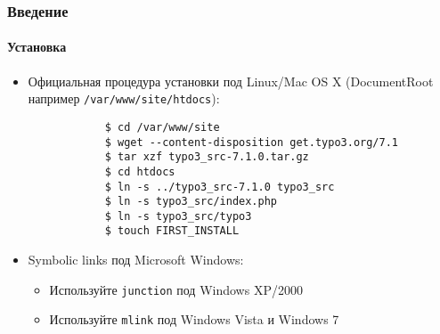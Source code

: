 \begin{frame}[fragile]
	\frametitle{Введение}
	\framesubtitle{Установка}

	\begin{itemize}
		\item Официальная процедура установки под Linux/Mac OS X\newline
			(DocumentRoot например \texttt{/var/www/site/htdocs}):
		\begin{lstlisting}
			$ cd /var/www/site
			$ wget --content-disposition get.typo3.org/7.1
			$ tar xzf typo3_src-7.1.0.tar.gz
			$ cd htdocs
			$ ln -s ../typo3_src-7.1.0 typo3_src
			$ ln -s typo3_src/index.php
			$ ln -s typo3_src/typo3
			$ touch FIRST_INSTALL
		\end{lstlisting}

		\item Symbolic links под Microsoft Windows:

			\begin{itemize}
				\item Используйте \texttt{junction} под Windows XP/2000
				\item Используйте \texttt{mlink} под Windows Vista и Windows 7
			\end{itemize}

	\end{itemize}
\end{frame}


